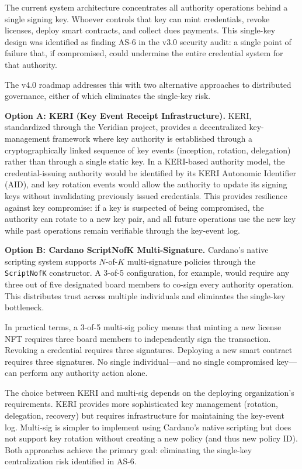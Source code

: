 The current system architecture concentrates all authority operations behind
a single signing key.  Whoever controls that key can mint credentials,
revoke licenses, deploy smart contracts, and collect dues payments.  This
single-key design was identified as finding AS-6 in the v3.0 security audit:
a single point of failure that, if compromised, could undermine the entire
credential system for that authority.

The v4.0 roadmap addresses this with two alternative approaches to
distributed governance, either of which eliminates the single-key risk.

\textbf{Option A: KERI (Key Event Receipt Infrastructure).}
KERI, standardized through the Veridian project, provides a decentralized
key-management framework where key authority is established through a
cryptographically linked sequence of key events (inception, rotation,
delegation) rather than through a single static key.  In a KERI-based
authority model, the credential-issuing authority would be identified by its
KERI Autonomic Identifier (AID), and key rotation events would allow the
authority to update its signing keys without invalidating previously issued
credentials.  This provides resilience against key compromise: if a key is
suspected of being compromised, the authority can rotate to a new key pair,
and all future operations use the new key while past operations remain
verifiable through the key-event log.

\textbf{Option B: Cardano ScriptNofK Multi-Signature.}
Cardano's native scripting system supports $N$-of-$K$ multi-signature
policies through the \texttt{ScriptNofK} constructor.  A 3-of-5
configuration, for example, would require any three out of five designated
board members to co-sign every authority operation.  This distributes trust
across multiple individuals and eliminates the single-key bottleneck.

In practical terms, a 3-of-5 multi-sig policy means that minting a new
license NFT requires three board members to independently sign the
transaction.  Revoking a credential requires three signatures.  Deploying a
new smart contract requires three signatures.  No single individual---and no
single compromised key---can perform any authority action alone.

The choice between KERI and multi-sig depends on the deploying
organization's requirements.  KERI provides more sophisticated key
management (rotation, delegation, recovery) but requires infrastructure for
maintaining the key-event log.  Multi-sig is simpler to implement using
Cardano's native scripting but does not support key rotation without
creating a new policy (and thus new policy ID).  Both approaches achieve the
primary goal: eliminating the single-key centralization risk identified in
AS-6.


